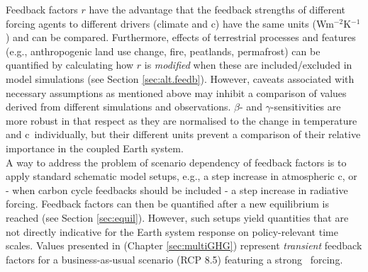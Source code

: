 Feedback factors $r$ have the advantage that the feedback strengths of different forcing agents to different drivers (climate and c\coo ) have the same units (Wm$^{-2}$K$^{-1}$) and can be compared. Furthermore, effects of terrestrial processes and features (e.g., anthropogenic land use change, fire, peatlands, permafrost) can be quantified by calculating how $r$ is {\it modified} when these are included/excluded in model simulations (see Section \ref{sec:alt.feedb}). However, caveats associated with necessary assumptions as mentioned above may inhibit a comparison of values derived from different simulations and observations. $\beta$- and $\gamma$-sensitivities are more robust in that respect as they are normalised to the change in temperature and c\coo\ individually, but their different units prevent a comparison of their relative importance in the coupled Earth system. \\

A way to address the problem of scenario dependency of feedback factors is to apply standard schematic model setups, e.g., a step increase in atmospheric c\coo , or - when carbon cycle feedbacks should be included - a step increase in radiative forcing. Feedback factors can then be quantified after a new equilibrium is reached (see Section \ref{sec:equil}). However, such setups yield quantities that are not directly indicative for the Earth system response on policy-relevant time scales. Values presented in \citet{stocker13natcc} (Chapter \ref{sec:multiGHG}) represent {\it transient} feedback factors for a business-as-usual scenario (RCP 8.5) featuring a strong \coo\ forcing.




